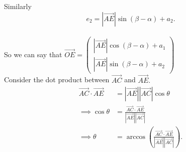 \documentclass{article}
\begin{document}
Similarly $$e_2 = |\overrightarrow{AE}| \sin{(\beta - \alpha)} + a_2.$$
\vspace{\baselineskip}\\
So we can say that $\overrightarrow{OE} = 
\begin{pmatrix}
	|\overrightarrow{AE}| \cos{(\beta - \alpha)} + a_1 \\
	|\overrightarrow{AE}| \sin{(\beta - \alpha)} + a_2
\end{pmatrix}$\vspace{\baselineskip}\\
Consider the dot product between $\overrightarrow{AC}$ and $\overrightarrow{AE}.$\vspace{\baselineskip}\\
\begin{align*}
\overrightarrow{AC} \cdot \overrightarrow{AE} &= |\overrightarrow{AE}||\overrightarrow{AC}| \cos{\theta}\\
\implies \cos{\theta} &= \frac{\overrightarrow{AC} \cdot \overrightarrow{AE}}{|\overrightarrow{AE}||\overrightarrow{AC}|}\\
\implies \theta &= \arccos{\left( \frac{\overrightarrow{AC} \cdot \overrightarrow{AE}}{|\overrightarrow{AE}||\overrightarrow{AC}|}\right)}.
\end{align*}
\end{document}
